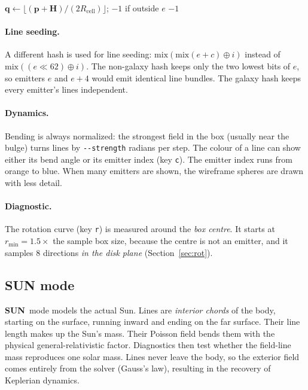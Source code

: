 \documentclass[12pt]{article}
\newcommand{\SUN}{\textcolor{sunc}{\textbf{\textsf{SUN}}}}
\newcommand{\opt}[1]{\texttt{-{}-#1}}
\newcommand{\vect}[1]{\mathbf{#1}}
\begin{document}
\begin{algorithm}[htbp]
\caption{\textsc{EmitterAt}$(\vect p)$ --- CSR lookup}
\begin{algorithmic}[1]
\State $\vect q\gets\lfloor(\vect p+\vect H)/(2R_\text{cell})\rfloor$; \Return $-1$ if outside
\For{$e$ in \texttt{egItems}[\texttt{egStart}$[q]$ .. \texttt{egStart}$[q{+}1]$)}
   \If{$|\vect p-\vect c_e|^2<R^2$} \Return $e$ \EndIf
\EndFor
\State \Return $-1$
\end{algorithmic}
\end{algorithm}

\paragraph{Line seeding.}
A different hash is used for line seeding: $\mathrm{mix}(\mathrm{mix}(e+c)\oplus i)$ instead of
$\mathrm{mix}((e\ll62)\oplus i)$. The non-galaxy hash keeps only the two lowest
bits of $e$, so emitters $e$ and $e+4$ would emit identical line bundles. The
galaxy hash keeps every emitter's lines independent.

\paragraph{Dynamics.}
Bending is always normalized: the strongest field in the box (usually near
the bulge) turns lines by \opt{strength} radians per step. The colour of a line can show
either its bend angle or its emitter index (key \texttt{c}). The emitter index runs
from orange to blue. When many emitters are shown, the wireframe spheres are drawn
with less detail.

\paragraph{Diagnostic.}
The rotation curve (key \texttt{r}) is measured around the \emph{box centre}. It
starts at $r_\text{min}=1.5\times$ the sample box size, because the centre is
not an emitter, and it samples 8 directions \emph{in the disk plane}
(Section~\ref{sec:rot}).

\subsection{SUN mode}
\label{sec:sun}

\begin{sunbox}
\SUN\ mode models the actual Sun. Lines are \emph{interior chords} of the body,
starting on the surface, running inward and ending on the far surface. Their
line length makes up the Sun's mass. Their Poisson field bends them
with the physical general-relativistic factor. Diagnostics then test whether
the field-line mass reproduces one solar mass. Lines never leave the body, so
the exterior field comes entirely from the solver (Gauss's law), resulting in the
recovery of Keplerian dynamics.
\end{sunbox}
\end{document}
